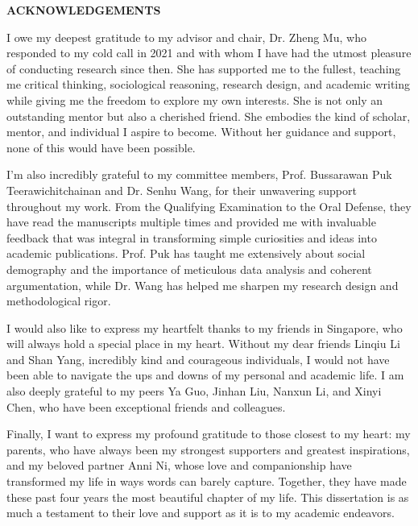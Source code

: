 \begin{center}
    {\large \textbf{ACKNOWLEDGEMENTS}}
\end{center}

\thispagestyle{plain}

I owe my deepest gratitude to my advisor and chair, Dr. Zheng Mu, who responded to my cold call in 2021 and with whom I have had the utmost pleasure of conducting research since then. She has supported me to the fullest, teaching me critical thinking, sociological reasoning, research design, and academic writing while giving me the freedom to explore my own interests. She is not only an outstanding mentor but also a cherished friend. She embodies the kind of scholar, mentor, and individual I aspire to become. Without her guidance and support, none of this would have been possible.

I'm also incredibly grateful to my committee members, Prof. Bussarawan Puk Teerawichitchainan and Dr. Senhu Wang, for their unwavering support throughout my work. From the Qualifying Examination to the Oral Defense, they have read the manuscripts multiple times and provided me with invaluable feedback that was integral in transforming simple curiosities and ideas into academic publications. Prof. Puk has taught me extensively about social demography and the importance of meticulous data analysis and coherent argumentation, while Dr. Wang has helped me sharpen my research design and methodological rigor.

I would also like to express my heartfelt thanks to my friends in Singapore, who will always hold a special place in my heart. Without my dear friends Linqiu Li and Shan Yang, incredibly kind and courageous individuals, I would not have been able to navigate the ups and downs of my personal and academic life. I am also deeply grateful to my peers Ya Guo, Jinhan Liu, Nanxun Li, and Xinyi Chen, who have been exceptional friends and colleagues.

Finally, I want to express my profound gratitude to those closest to my heart: my parents, who have always been my strongest supporters and greatest inspirations, and my beloved partner Anni Ni, whose love and companionship have transformed my life in ways words can barely capture. Together, they have made these past four years the most beautiful chapter of my life. This dissertation is as much a testament to their love and support as it is to my academic endeavors.

\clearpage